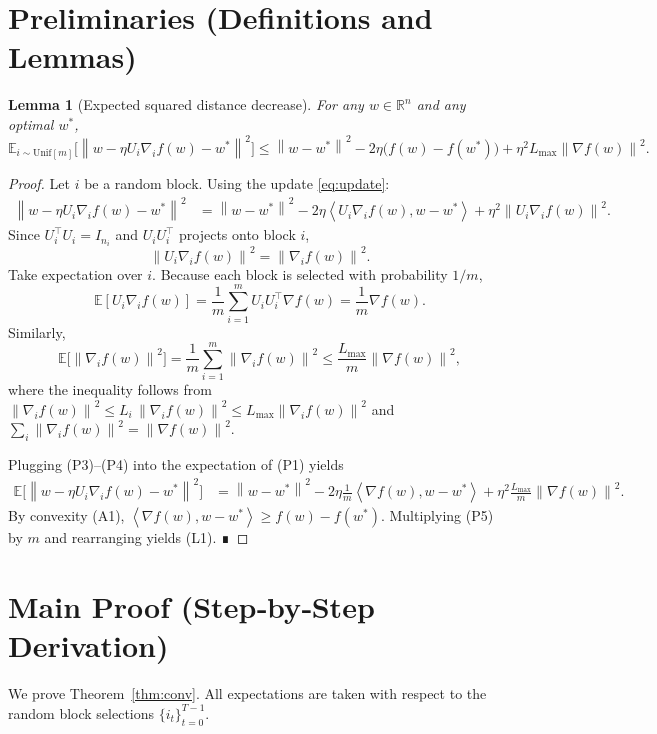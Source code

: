 \documentclass{article}
\newtheorem{lemma}{Lemma}
\newcommand{\E}{\mathbb{E}}
\newcommand{\R}{\mathbb{R}}
\newcommand{\norm}[1]{\left\|#1\right\|}
\newcommand{\ip}[2]{\left\langle #1,#2\right\rangle}
\begin{document}
\section*{Preliminaries (Definitions and Lemmas)}
\begin{lemma}[Expected squared distance decrease]
\label{lem:dist}
For any $w\in\R^{n}$ and any optimal $w^{\ast}$,
\[
\E_{i\sim\text{Unif}[m]}\bigl[\norm{w-\eta U_i\nabla_i f(w)-w^{\ast}}^{2}\bigr]
\le
\norm{w-w^{\ast}}^{2}
-2\eta\bigl(f(w)-f(w^{\ast})\bigr)
+\eta^{2}L_{\max}\norm{\nabla f(w)}^{2}.
\tag{L1}
\]
\end{lemma}
\begin{proof}
Let $i$ be a random block. Using the update \eqref{eq:update}:
\[
\begin{aligned}
\norm{w-\eta U_i\nabla_i f(w)-w^{\ast}}^{2}
&=
\norm{w-w^{\ast}}^{2}
-2\eta\ip{U_i\nabla_i f(w)}{w-w^{\ast}}
+\eta^{2}\norm{U_i\nabla_i f(w)}^{2}.
\end{aligned}
\tag{P1}
\]
Since $U_i^{\top}U_i=I_{n_i}$ and $U_iU_i^{\top}$ projects onto block $i$,
\[
\norm{U_i\nabla_i f(w)}^{2}= \norm{\nabla_i f(w)}^{2}.
\tag{P2}
\]
Take expectation over $i$.
Because each block is selected with probability $1/m$,
\[
\E[U_i\nabla_i f(w)]=\frac1m\sum_{i=1}^{m}U_iU_i^{\top}\nabla f(w)=\frac1m\nabla f(w).
\tag{P3}
\]
Similarly,
\[
\E\bigl[\norm{\nabla_i f(w)}^{2}\bigr]=\frac1m\sum_{i=1}^{m}\norm{\nabla_i f(w)}^{2}
\le \frac{L_{\max}}{m}\norm{\nabla f(w)}^{2},
\tag{P4}
\]
where the inequality follows from $\norm{\nabla_i f(w)}^{2}\le L_i\,\norm{\nabla_i f(w)}^{2}\le L_{\max}\norm{\nabla_i f(w)}^{2}$ and $\sum_i\norm{\nabla_i f(w)}^{2}=\norm{\nabla f(w)}^{2}$.

Plugging (P3)–(P4) into the expectation of (P1) yields
\[
\begin{aligned}
\E\bigl[\norm{w-\eta U_i\nabla_i f(w)-w^{\ast}}^{2}\bigr]
&=
\norm{w-w^{\ast}}^{2}
-2\eta\frac{1}{m}\ip{\nabla f(w)}{w-w^{\ast}}
+\eta^{2}\frac{L_{\max}}{m}\norm{\nabla f(w)}^{2}.
\end{aligned}
\tag{P5}
\]
By convexity (A1), $\ip{\nabla f(w)}{w-w^{\ast}}\ge f(w)-f(w^{\ast})$. Multiplying (P5) by $m$ and rearranging yields (L1). ∎
\end{proof}

\section*{Main Proof (Step‑by‑Step Derivation)}
We prove Theorem~\ref{thm:conv}.  
All expectations are taken with respect to the random block selections $\{i_t\}_{t=0}^{T-1}$.
\end{document}
